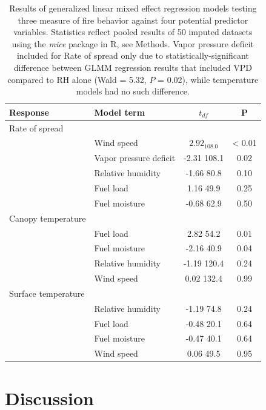 \documentclass[referee, 
		     sn-basic]{sn-jnl}
\begin{document}
\begin{linenumbers}
\begin{table}
\caption{Results of generalized linear mixed effect regression models testing three measure of fire behavior against four potential predictor variables. 
Statistics reflect pooled results of 50 imputed datasets using the \emph{mice} package in \textsf{R},  see Methods. 
Vapor pressure deficit included for Rate of spread only due to statistically-significant difference between GLMM regression results that included VPD compared to RH alone (Wald = 5.32, $P$ = 0.02), while temperature models had no such
difference. \label{RegResults} }
\centering 
\begin{tabular}{llcc}
\toprule
Response & Model term & $t_{df}$ & P \\
\midrule

Rate of spread & & & \\
& Wind speed & $2.92_{108.0}$ & \textless{} 0.01 \\
& Vapor pressure deficit & -2.31 108.1 & 0.02 \\
& Relative humidity & -1.66 80.8 & 0.10 \\
& Fuel load & 1.16 49.9 & 0.25 \\
& Fuel moisture & -0.68 62.9 & 0.50 \\
Canopy temperature & & & \\
& Fuel load & 2.82 54.2 & 0.01 \\
& Fuel moisture & -2.16 40.9 & 0.04 \\
& Relative humidity & -1.19 120.4 & 0.24 \\
& Wind speed & 0.02 132.4 & 0.99 \\
Surface temperature & & & \\
& Relative humidity & -1.19 74.8 & 0.24 \\
& Fuel load & -0.48 20.1 & 0.64 \\
& Fuel moisture & -0.47 40.1 & 0.64 \\
& Wind speed & 0.06 49.5 & 0.95 \\
\bottomrule
\end{tabular}
\end{table}

\section{Discussion}


\end{linenumbers}
\end{document}
